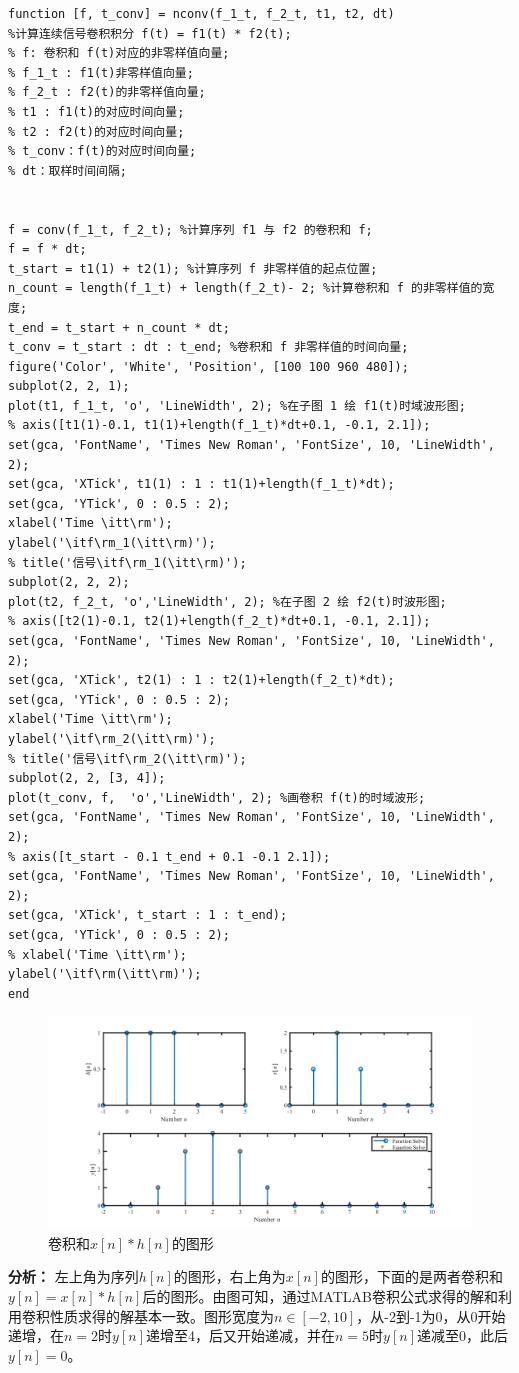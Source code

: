 \documentclass[UTF8,AutoFakeBold]{ctexart}
\begin{document}
\begin{enumerate}
\begin{enumerate}
\begin{lstlisting}
function [f, t_conv] = nconv(f_1_t, f_2_t, t1, t2, dt)
%计算连续信号卷积积分 f(t) = f1(t) * f2(t);
% f: 卷积和 f(t)对应的非零样值向量;
% f_1_t : f1(t)非零样值向量;
% f_2_t : f2(t)的非零样值向量;
% t1 : f1(t)的对应时间向量;
% t2 : f2(t)的对应时间向量;
% t_conv：f(t)的对应时间向量;
% dt：取样时间间隔;


f = conv(f_1_t, f_2_t); %计算序列 f1 与 f2 的卷积和 f;
f = f * dt;
t_start = t1(1) + t2(1); %计算序列 f 非零样值的起点位置;
n_count = length(f_1_t) + length(f_2_t)- 2; %计算卷积和 f 的非零样值的宽度;
t_end = t_start + n_count * dt;
t_conv = t_start : dt : t_end; %卷积和 f 非零样值的时间向量;
figure('Color', 'White', 'Position', [100 100 960 480]);
subplot(2, 2, 1);
plot(t1, f_1_t, 'o', 'LineWidth', 2); %在子图 1 绘 f1(t)时域波形图;
% axis([t1(1)-0.1, t1(1)+length(f_1_t)*dt+0.1, -0.1, 2.1]);
set(gca, 'FontName', 'Times New Roman', 'FontSize', 10, 'LineWidth', 2);
set(gca, 'XTick', t1(1) : 1 : t1(1)+length(f_1_t)*dt);
set(gca, 'YTick', 0 : 0.5 : 2);
xlabel('Time \itt\rm');
ylabel('\itf\rm_1(\itt\rm)');
% title('信号\itf\rm_1(\itt\rm)');
subplot(2, 2, 2);
plot(t2, f_2_t, 'o','LineWidth', 2); %在子图 2 绘 f2(t)时波形图;
% axis([t2(1)-0.1, t2(1)+length(f_2_t)*dt+0.1, -0.1, 2.1]);
set(gca, 'FontName', 'Times New Roman', 'FontSize', 10, 'LineWidth', 2);
set(gca, 'XTick', t2(1) : 1 : t2(1)+length(f_2_t)*dt);
set(gca, 'YTick', 0 : 0.5 : 2);
xlabel('Time \itt\rm');
ylabel('\itf\rm_2(\itt\rm)');
% title('信号\itf\rm_2(\itt\rm)');
subplot(2, 2, [3, 4]);
plot(t_conv, f,  'o','LineWidth', 2); %画卷积 f(t)的时域波形;
set(gca, 'FontName', 'Times New Roman', 'FontSize', 10, 'LineWidth', 2);
% axis([t_start - 0.1 t_end + 0.1 -0.1 2.1]);
set(gca, 'FontName', 'Times New Roman', 'FontSize', 10, 'LineWidth', 2);
set(gca, 'XTick', t_start : 1 : t_end);
set(gca, 'YTick', 0 : 0.5 : 2);
% xlabel('Time \itt\rm');
ylabel('\itf\rm(\itt\rm)');
end
				\end{lstlisting}	
				\begin{figure}[H]
					\centering
					\includegraphics[scale=0.5]{./figures/photo7.png}
					\caption{卷积和$x[n]*h[n]$的图形}
				\end{figure}

				\textbf{\songti 分析：} 左上角为序列$h[n]$的图形，右上角为$x[n]$的图形，下面的是两者卷积和$y[n]=x[n]*h[n]$后的图形。由图可知，通过MATLAB卷积公式求得的解和利用卷积性质求得的解基本一致。图形宽度为$n\in [-2,10]$，从-2到-1为0，从0开始递增，在$n=2$时$y[n]$递增至4，后又开始递减，并在$n=5$时$y[n]$递减至0，此后$y[n]=0$。
		\end{enumerate}
	\end{enumerate}
\end{document}
